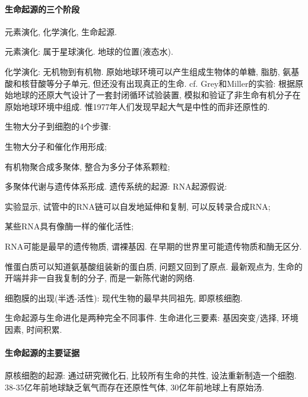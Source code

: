 \documentclass{ctexart}
\begin{document}

\paragraph{生命起源的三个阶段} %
\label{par:生命起源的三个阶段}

元素演化, 化学演化, 生命起源.
\begin{cenum}
    \item 元素演化: 属于星球演化. 地球的位置(液态水).
    \item 化学演化: 无机物到有机物. 原始地球环境可以产生组成生物体的单糖, 脂肪, 氨基酸和核苷酸等分子单元, 但还没有出现真正的生命. cf. Grey和Miller的实验: 根据原始地球的还原大气设计了一套封闭循环试验装置, 模拟和验证了非生命有机分子在原始地球环境中组成. 惟1977年人们发现早起大气是中性的而非还原性的.
    \item 生物大分子到细胞的4个步骤:
    \begin{cenum}
        \item 生物大分子和催化作用形成;
        \item 有机物聚合成多聚体, 整合为多分子体系颗粒;
        \item 多聚体代谢与遗传体系形成. 遗传系统的起源: RNA起源假说:
        \begin{cenum}
            \item 实验显示, 试管中的RNA链可以自发地延伸和复制, 可以反转录合成RNA;
            \item 某些RNA具有像酶一样的催化活性;
            \item RNA可能是最早的遗传物质, 谓裸基因. 在早期的世界里可能遗传物质和酶无区分.
        \end{cenum}
        惟蛋白质可以知道氨基酸组装新的蛋白质, 问题又回到了原点. 最新观点为, 生命的开端并非一自我复制的分子, 而是一新陈代谢的网络.
        \item 细胞膜的出现(半透-活性): 现代生物的最早共同祖先, 即原核细胞.
    \end{cenum}
\end{cenum}
生命起源与生命进化是两种完全不同事件. 生命进化三要素: 基因突变/选择, 环境因素, 时间积累.


\paragraph{生命起源的主要证据} %
\label{par:生命起源的主要证据}

原核细胞的起源: 通过研究微化石, 比较所有生命的共性, 设法重新制造一个细胞. 38-35亿年前地球缺乏氧气而存在还原性气体, 30亿年前地球上有原始汤.
\end{document}
